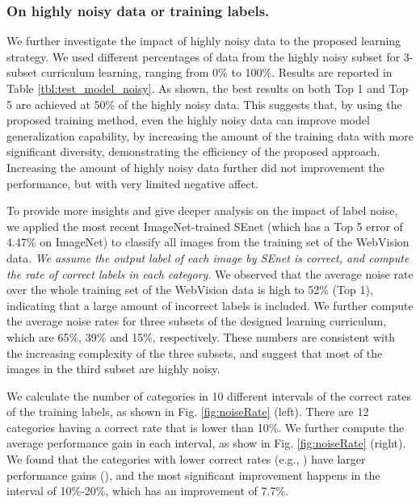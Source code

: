 \documentclass[runningheads]{llncs}
\begin{document}
\subsubsection{On highly noisy data or training labels.}
We further investigate the impact of highly noisy data to the proposed learning strategy. We used different percentages of data from the highly noisy subset for 3-subset curriculum learning, ranging from 0\% to 100\%. Results are reported in Table \ref{tbl:test_model_noisy}. As shown, the best results on both Top 1 and Top 5 are achieved at 50\% of the highly noisy data. This suggests that, by using the proposed training method, even the highly noisy data can improve model generalization capability, by increasing the amount of the training data with more significant diversity, demonstrating the efficiency of the proposed approach. Increasing the amount of highly noisy data further did not improvement the performance, but with very limited negative affect.

To provide more insights and give deeper analysis on the impact of label noise, we applied the most recent ImageNet-trained SEnet \cite{hu2017squeeze} (which has a Top 5 error of 4.47\%  on ImageNet) to classify all images from the training set of the WebVision data. \emph{We assume the output label of each image by SEnet is correct, and compute the rate of correct labels in each category}. We observed that the average noise rate over the whole training set of the WebVision data is high to 52\% (Top 1), indicating that a large amount of incorrect labels is included. We further compute the average noise rates for three subsets of the designed learning curriculum, which are 65\%, 39\% and 15\%, respectively. These numbers are consistent with the increasing complexity of the three subsets, and suggest that most of the images in the third subset are highly noisy.

We calculate the number of categories in 10 different intervals of the correct rates of the training labels, as shown in Fig. \ref{fig:noiseRate} (left). There are 12 categories having a correct rate that is lower than 10\%. We further compute the average performance gain in each interval, as show in Fig. \ref{fig:noiseRate} (right). We found that the categories with lower correct rates (e.g., ) have larger performance gains (), and the most significant improvement happens in the interval of 10\%-20\%, which has an improvement of 7.7\%.
\begin{figure*}[tb]
\setlength{\abovecaptionskip}{-5pt}
\setlength{\belowcaptionskip}{-9pt}
\centering
{}
\vspace{-5mm}
\caption{Numbers of categories (left), and performance improvements (right) in 10 different rate intervals of the training labels.}
\label{fig:noiseRate}
\end{figure*}
\end{document}
